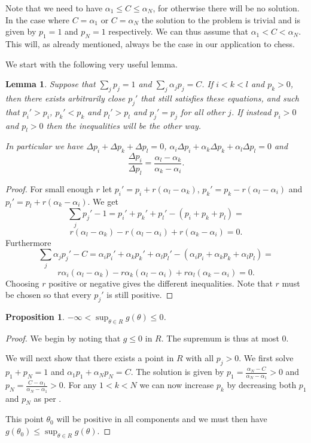\documentclass{article}
\theoremstyle{plain}
\newtheorem{proposition} {\bf Proposition} [section]
\newtheorem{lemma}       {\bf Lemma}       [section]
\theoremstyle{definition}
\begin{document}
Note that we need to have $\alpha_1\leq C\leq\alpha_N$, for otherwise there will be no solution.
In the case where $C=\alpha_1$ or $C=\alpha_N$ the solution to the problem is trivial and is given
by $p_1=1$ and $p_N=1$ respectively. We can thus assume that $\alpha_1<C<\alpha_N$. This will,
as already mentioned, always be the case in our application to chess.

We start with the following very useful lemma.

\begin{lemma}\label{increase}
	Suppose that $\sum_jp_j=1$ and $\sum_j\alpha_jp_j=C$. If $i<k<l$ and $p_k>0$,
	then there exists arbitrarily close $p_j'$ that still satisfies these equations,
	and such that $p_i'>p_i$, $p_k'<p_k$ and $p_l'>p_l$ and $p_j'=p_j$ for all other $j$.
	If instead $p_i>0$ and $p_l>0$ then the inequalities will be the other way.

	In particular we have $\Delta p_i+\Delta p_k+\Delta p_l=0$,
	$\alpha_i\Delta p_i+\alpha_k\Delta p_k+\alpha_l\Delta p_l=0$ and
	$$\frac{\Delta p_i}{\Delta p_l}=\frac{\alpha_l-\alpha_k}{\alpha_k-\alpha_i}.$$
\end{lemma}
\begin{proof}
	For small enough $r$ let $p_i'=p_i+r(\alpha_l-\alpha_k)$, $p_k'=p_k-r(\alpha_l
	-\alpha_i)$ and $p_l'=p_l+r(\alpha_k-\alpha_i)$. We get
	$$\sum_jp_j'-1=p_i'+p_k'+p_l'-(p_i+p_k+p_l)=$$
	$$r(\alpha_l-\alpha_k)-r(\alpha_l-\alpha_i)
	+r(\alpha_k-\alpha_i)=0.$$
	Furthermore
	$$\sum_j\alpha_jp_j'-C=\alpha_ip_i'+\alpha_kp_k'+\alpha_lp_l'-(\alpha_ip_i+
	\alpha_kp_k+\alpha_lp_l)=$$
	$$r\alpha_i(\alpha_l-\alpha_k)-r\alpha_k(\alpha_l-\alpha_i)+
	r\alpha_l(\alpha_k-\alpha_i)=0.$$
	Choosing $r$ positive or negative gives the different inequalities. Note that
	$r$ must be chosen so that every $p_j'$ is still positive.
\end{proof}

\begin{proposition}\label{supremum}
	$-\infty<\sup_{\theta\in R}g(\theta)\leq 0$.
\end{proposition}
\begin{proof}
	We begin by noting that $g\leq 0$ in $R$. The supremum is thus at most $0$.

	We will next show that there exists a point in $R$ with all $p_j>0$. We first
	solve $p_1+p_N=1$ and $\alpha_1p_1+\alpha_Np_N=C$. The solution is given by
	$p_1=\frac{\alpha_N-C}{\alpha_N-\alpha_1}>0$ and $p_N=\frac{C-\alpha_1}
	{\alpha_N-\alpha_1}>0$. For any $1<k<N$ we can now increase $p_k$ by decreasing
	both $p_1$ and $p_N$ as per .
	
	This point $\theta_0$ will be
	positive in all components and we must then have
	$g(\theta_0)\leq\sup_{\theta\in R}g(\theta)$.

\end{proof}
\end{document}
